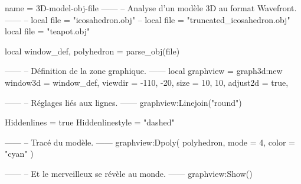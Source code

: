 \documentclass{standalone}
\begin{document}
\begin{luadraw}{name = 3D-model-obj-file}
------
-- Analyse d'un modèle 3D au format Wavefront.
------
-- local file = "icosahedron.obj"
-- local file = "truncated_icosahedron.obj"
local file = "teapot.obj"

local window_def, polyhedron = parse_obj(file)

------
-- Définition de la zone graphique.
------
local graphview = graph3d:new{
  window3d = window_def,
  viewdir  = {-110, -20},
  size     = {10, 10},
  adjust2d = true,
}

------
-- Réglages liés aux lignes.
------
graphview:Linejoin("round")

Hiddenlines     = true
Hiddenlinestyle = "dashed"

------
-- Tracé du modèle.
------
graphview:Dpoly(
  polyhedron,
  {
    mode  = 4,
    color = "cyan"
  })

------
-- Et le merveilleux se révèle au monde.
------
graphview:Show()
\end{luadraw}
\end{document}

